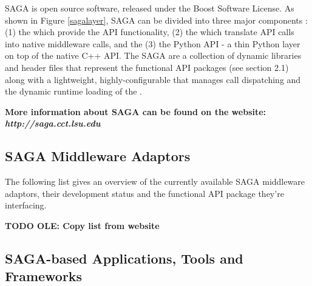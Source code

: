     SAGA is open source software, released under the Boost Software
    License. As shown in Figure \ref{sagalayer}, SAGA can be divided
    into three major components : (1) the  which
    provide the API functionality, (2) the  which translate
    API calls into native middleware calls, and the (3) the Python API
     - a thin Python layer on top of the native C++
    API. The SAGA  are a collection of dynamic
    libraries and header files that represent the functional API
    packages (see section 2.1) along with a lightweight,
    highly-configurable  that manages call dispatching and
    the dynamic runtime loading of the .

    \textbf{More information about SAGA can be found on the
    website: \\ \textit{http://saga.cct.lsu.edu}}

\subsection{SAGA Middleware Adaptors}

    The following list gives an overview of the currently available SAGA
    middleware adaptors, their development status and the functional API
    package they're interfacing.
    
    \textbf{TODO OLE: Copy list from website}
    
    
\subsection{SAGA-based Applications, Tools and Frameworks}
    
	

